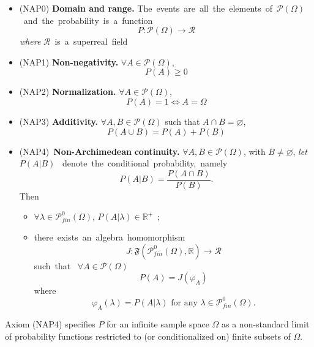 \begin{itemize}
\item (NAP0) \textbf{Domain and range. }\textrm{The\ events\ are\ all\ the\ elements\ of\ }$\mathcal{P}\left( \Omega \right) $\textrm{\ and\ the\ probability\ is\ a\ function}
$$
P:\mathcal{P}\left( \Omega \right) \rightarrow \mathcal{R}
$$
\textit{where }$\mathcal{R}$\textrm{\ is\ a\ superreal\ field}

\item (NAP1) \textbf{Non-negativity.} $\forall A\in \mathcal{P}\left( \Omega \right)$,
$$
P(A)\geq 0
$$

\item (NAP2) \textbf{Normalization.} $\forall A\in \mathcal{P}\left( \Omega \right)$,
$$
P(A)=1\Leftrightarrow A=\Omega
$$

\item (NAP3) \textbf{Additivity.} $\forall A, B\in \mathcal{P}\left( \Omega \right)$ such that $A\cap B=\varnothing$,
$$
P(A\cup B)=P(A)+P(B)
$$

\item (NAP4)\ \textbf{Non-Archimedean} \textbf{continuity.} $\forall A, B\in \mathcal{P}\left( \Omega \right)$, with $B\neq \varnothing$, \textit{let }$P(A|B)$ \textrm{\ denote\ the\ conditional\ probability,\ namely}
\begin{equation}
P(A|B)=\frac{P(A\cap B)}{P(B)}.  \label{4+}
\end{equation}
Then

\begin{itemize}
\item $\forall \lambda \in \mathcal{P}_{fin}^0(\Omega )$, $P(A|\lambda )\in \mathbb{R^+}$\textit{\ };

\item \textrm{there\ exists\ an\ algebra\ homomorphism}
$$
J:\mathfrak{F}\left( \mathcal{P}_{fin}^0(\Omega ),\mathbb{R}\right) \rightarrow \mathcal{R}
$$
\textrm{such\ that\ } $\forall A\in \mathcal{P}(\Omega )$
$$
P(A)=J\left( \varphi _{A}\right)
$$
\textrm{where}
$$
\varphi _{A}(\lambda )=P(A|\lambda ) \textrm{\ for\ any\ } \lambda \in \mathcal{P}_{fin}^0(\Omega).
$$
\end{itemize}
\end{itemize}

Axiom (NAP4) specifies $P$ for an infinite sample space $\Omega$ as a non-standard limit of probability functions restricted to (or conditionalized on) finite subsets of $\Omega$.

